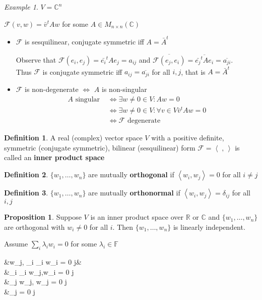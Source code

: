 \documentclass[11pt, a4paper]{report}
\makeatletter
\numberwithin{equation}{section}
\newcommand{\R}{\mathbb{R}}
\newcommand{\C}{\mathbb{C}}
\newcommand{\F}{\mathbb{F}}
\newcommand{\Fc}{\mathcal{F}}
\newcommand{\spn}[1]{\left\langle #1 \right\rangle}
\numberwithin{equation}{subsection}
\theoremstyle{plain}
\theoremstyle{definition}
\newtheorem{defn}{Definition}[chapter]
\newtheorem{prop}[thm]{Proposition}
\theoremstyle{remark}
\newtheorem{exmp}{Example}[chapter]
\newtheorem*{prf}{Proof}
\renewenvironment{prf}[1][\proofname]{\par
  \vspace{-\topsep}%
  \normalfont
  \topsep0pt \partopsep0pt %
  \trivlist
  \item[\hskip\labelsep
        \itshape
    #1\@addpunct{.}]\ignorespaces
}{%
  \popQED\endtrivlist\@endpefalse
  \addvspace{6pt plus 6pt} %
}
\newcommand{\pr}[1]{\begin{adjustwidth}{1cm}{} \begin{prf} #1 \end{prf} \end{adjustwidth}}
\makeatother
\begin{document}
\begin{exmp}
$V = \C^n$

$\Fc(v,w) = \bar{v}^tAw$ for some $A \in M_{n \times n}(\C)$
\begin{itemize}
\item $\Fc$ is sesquilinear, conjugate symmetric iff $A = \bar{A}^t$

Observe that $\Fc(e_i,e_j) = \bar{e_i}^t A e_j = a_{ij}$ and $\overline{\Fc(e_j,e_i)} = \overline{\bar{e_j}^t A e_i} = \overline{a_{ji}}$.\\ Thus $\Fc$ is conjugate symmetric iff $a_{ij} = \overline{a_{ji}}$ for all $i,j$, that is $A = \bar{A}^t$

\item $\Fc$ is non-degenerate $\iff$ $A$ is non-singular
\begin{align*}
A \text{ singular }	&\iff \exists w \neq 0 \in V : Aw = 0\\
					&\iff \exists w \neq 0 \in V : \forall v \in V \bar{v}^tAw = 0\\
					&\iff \Fc \text{ degenerate }
\end{align*}
\end{itemize}
\end{exmp}

\begin{defn}
A real (complex) vector space $V$ with a positive definite, symmetric (conjugate symmetric), bilinear (sesquilinear) form $\Fc = \spn{\;,\,}$ is called an \textbf{inner product space}
\end{defn}

\begin{defn} 
$\{ w_1, \ldots, w_n \}$ are mutually \textbf{orthogonal} if $\spn{w_i,w_j} = 0$ for all $i \neq j$
\end{defn}

\begin{defn}
$\{ w_1, \ldots, w_n \}$ are mutually \textbf{orthonormal} if $\spn{w_i, w_j} = \delta_{ij}$ for all $i,j$
\end{defn}

\begin{prop}
Suppose $V$ is an inner product space over $\R$ or $\C$ and $\{ w_1, \ldots, w_n \}$ are orthogonal with $w_i \neq 0$ for all $i$. Then $\{ w_1, \ldots, w_n \}$ is linearly independent.

\pr{
Assume $\sum_i \lambda_i w_i = 0$ for some $\lambda_i \in \F$
\begin{flalign*}
&\Rightarrow \spn{w_j, \sum_i \lambda_i w_i} = 0 \hspace{24pt} \forall j&\\
&\Rightarrow \sum_i \lambda_i \spn{w_j,w_i} = 0 \hspace{30pt} \forall j\\
&\Rightarrow \lambda_j \spn{w_j, w_j} = 0 \hspace{45pt} \forall j\\
&\Rightarrow \lambda_j = 0 \hspace{83.5pt} \forall j
\end{flalign*}
}
\end{prop}
\end{document}
